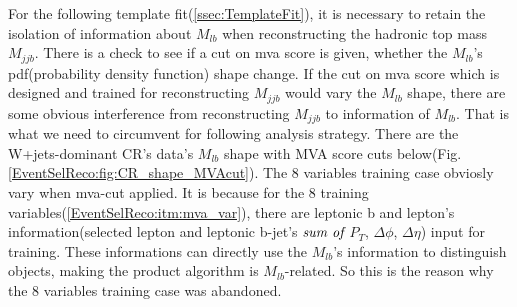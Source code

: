 		For the following template fit(\ref{ssec:TemplateFit}), it is necessary to retain the isolation of information about $M_{lb}$ when reconstructing the hadronic top mass $M_{jjb}$. There is a check to see if a cut on mva score is given, whether the $M_{lb}$'s pdf(probability density function) shape change. If the cut on mva score which is designed and trained for reconstructing $M_{jjb}$ would vary the $M_{lb}$ shape, there are some obvious interference from reconstructing $M_{jjb}$ to information of $M_{lb}$. That is what we need to circumvent for following analysis strategy. There are the W+jets-dominant CR's data's $M_{lb}$ shape with MVA score cuts below(Fig.\ref{EventSelReco:fig:CR_shape_MVAcut}). The 8 variables training case obviosly vary when mva-cut applied. It is because for the 8 training variables(\ref{EventSelReco:itm:mva_var}), there are leptonic b and lepton's information(selected lepton and leptonic b-jet's $\emph{sum of}$ $P_{T}$, $\Delta \phi$, $\Delta \eta$) input for training. These informations can directly use the $M_{lb}$'s information to distinguish objects, making the product algorithm is $M_{lb}$-related. So this is the reason why the 8 variables training case was abandoned.

